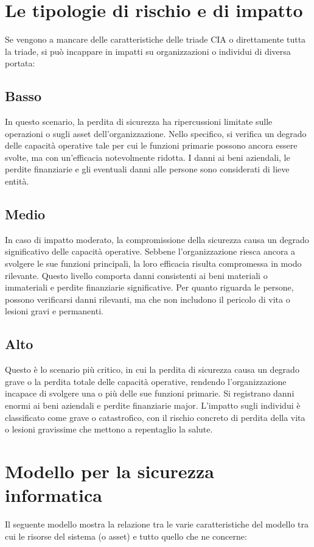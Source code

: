 \documentclass{article}
\begin{document}
\section{Le tipologie di rischio e di impatto}
Se vengono a mancare delle caratteristiche delle triade CIA o direttamente tutta la triade, si può incappare in impatti su organizzazioni o individui di diversa portata:

\subsection*{Basso}
In questo scenario, la perdita di sicurezza ha ripercussioni limitate sulle operazioni o sugli asset dell'organizzazione. Nello specifico, si verifica un degrado delle capacità operative tale per cui le funzioni primarie possono ancora essere svolte, ma con un'efficacia notevolmente ridotta. I danni ai beni aziendali, le perdite finanziarie e gli eventuali danni alle persone sono considerati di lieve entità.

\subsection*{Medio}
In caso di impatto moderato, la compromissione della sicurezza causa un degrado significativo delle capacità operative. Sebbene l'organizzazione riesca ancora a svolgere le sue funzioni principali, la loro efficacia risulta compromessa in modo rilevante. Questo livello comporta danni consistenti ai beni materiali o immateriali e perdite finanziarie significative. Per quanto riguarda le persone, possono verificarsi danni rilevanti, ma che non includono il pericolo di vita o lesioni gravi e permanenti.

\subsection*{Alto}
Questo è lo scenario più critico, in cui la perdita di sicurezza causa un degrado grave o la perdita totale delle capacità operative, rendendo l'organizzazione incapace di svolgere una o più delle sue funzioni primarie. Si registrano danni enormi ai beni aziendali e perdite finanziarie major. L'impatto sugli individui è classificato come grave o catastrofico, con il rischio concreto di perdita della vita o lesioni gravissime che mettono a repentaglio la salute.

\section{Modello per la sicurezza informatica}
Il seguente modello mostra la relazione tra le varie caratteristiche del modello tra cui le risorse del sistema (o asset) e tutto quello che ne concerne:
\end{document}
